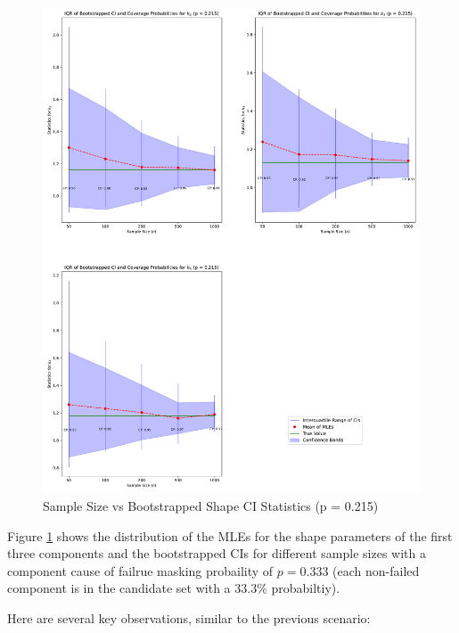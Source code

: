 \documentclass[
]{article}
\begin{document}
\begin{figure}

{\centering \includegraphics{image/plot-n-vs-stats-p215-shape} 

}

\caption{Sample Size vs Bootstrapped Shape CI Statistics (p = 0.215)}\label{fig:samp-size-n-vs-stats-p215-shape}
\end{figure}

Figure \ref{fig:samp-size-n-vs-stats-p215-shape} shows the distribution
of the MLEs for the shape parameters of the first three components and
the bootstrapped CIs for different sample sizes with a component cause
of failrue masking probaility of \(p = 0.333\) (each non-failed
component is in the candidate set with a \(33.3\%\) probabiltiy).

Here are several key observations, similar to the previous scenario:
\end{document}
